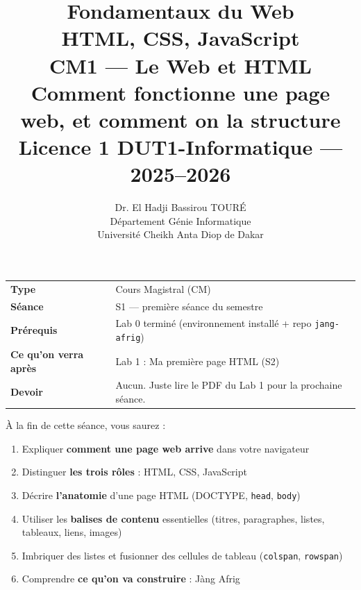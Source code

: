 \documentclass[11pt,a4paper]{article}
\title{%
\vspace{-1cm}
\textbf{\LARGE Fondamentaux du Web}\\
\textbf{\LARGE HTML, CSS, JavaScript}\\[0.8cm]
\textbf{\huge CM1 --- Le Web et HTML}\\[0.3cm]
\textbf{\Large Comment fonctionne une page web, et comment on la structure}\\[0.5cm]
\large Licence 1 DUT1-Informatique --- 2025--2026}
\author{Dr. El Hadji Bassirou TOURÉ\\
Département Génie Informatique\\
Université Cheikh Anta Diop de Dakar}
\date{}
\begin{document}
\maketitle
\thispagestyle{empty}

\vspace{0.5cm}

\begin{prereqbox}
\begin{center}
\begin{tabular}{ll}
\toprule
\textbf{Type} & Cours Magistral (CM) \\
\textbf{Séance} & S1 --- première séance du semestre \\
\textbf{Prérequis} & Lab 0 terminé (environnement installé + repo \texttt{jang-afrig}) \\
\textbf{Ce qu'on verra après} & Lab 1 : Ma première page HTML (S2) \\
\textbf{Devoir} & Aucun. Juste lire le PDF du Lab 1 pour la prochaine séance. \\
\bottomrule
\end{tabular}
\end{center}
\end{prereqbox}

\begin{objectifbox}[Objectifs du CM]
À la fin de cette séance, vous saurez :
\begin{enumerate}[nosep]
    \item Expliquer \textbf{comment une page web arrive} dans votre navigateur
    \item Distinguer \textbf{les trois rôles} : HTML, CSS, JavaScript
    \item Décrire \textbf{l'anatomie} d'une page HTML (DOCTYPE, \texttt{head}, \texttt{body})
    \item Utiliser les \textbf{balises de contenu} essentielles (titres, paragraphes, listes, tableaux, liens, images)
    \item Imbriquer des listes et fusionner des cellules de tableau (\texttt{colspan}, \texttt{rowspan})
    \item Comprendre \textbf{ce qu'on va construire} : Jàng Afrig
\end{enumerate}
\end{objectifbox}

\tableofcontents
\end{document}
